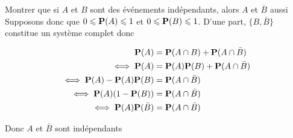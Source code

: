 \documentclass{article}
\begin{document}
\begin{question_kholle}{Montrer que si $A$ et $B$ sont des événements indépendants, alors $A$ et $\overline{B}$ aussi}
	Supposons donc que $0 \leqslant \mathbf P(A) \leqslant 1$ et $0 \leqslant \mathbf P(B) \leqslant 1$.
	D'une part, $\{ B, \bar{B} \}$ constitue un système complet donc
	
	\begin{align*}
		\mathbf P(A) &= \mathbf P(A \cap B) + \mathbf P(A \cap \bar{B}) \\
		\iff \mathbf P(A)&= \mathbf P(A) \mathbf P(B) + \mathbf P(A \cap \bar{B}) \\
		\iff \mathbf P(A) - \mathbf P(A) \mathbf P(B) &= \mathbf P(A \cap \bar{B}) \\
		\iff \mathbf P(A)(1-\mathbf P(B))&= \mathbf P(A \cap \bar{B}) \\
		\iff \mathbf P(A) \mathbf P(\bar{B})&= \mathbf P(A \cap \bar{B})
	\end{align*}
	
	Donc $A$ et $\bar B$ sont indépendants
\end{question_kholle}
\end{document}
